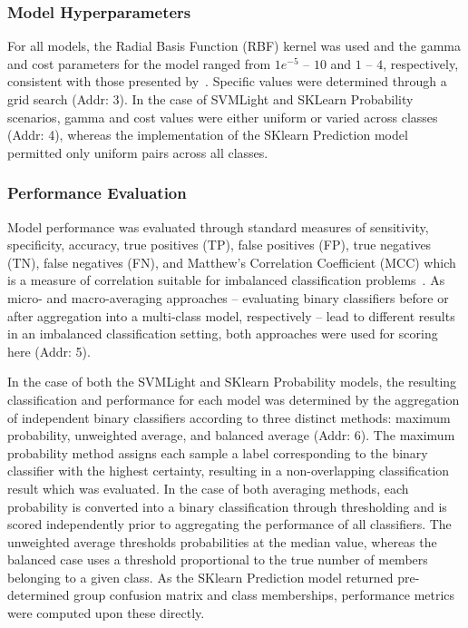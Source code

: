 \subsubsection{Model Hyperparameters}
For all models, the Radial Basis Function (RBF) kernel was used and the gamma and cost parameters for the model ranged
from $1e^{-5}$ -- $10$ and $1$ -- $4$, respectively, consistent with those presented by~\cite{mishra2014prediction}.
Specific values were determined through a grid search (Addr: 3). In the case of SVMLight and SKLearn Probability
scenarios, gamma and cost values were either uniform or varied across classes (Addr: 4), whereas the implementation of
the SKlearn Prediction model permitted only uniform pairs across all classes.

\subsubsection{Performance Evaluation}
Model performance was evaluated through standard measures of sensitivity, specificity, accuracy, true positives (TP),
false positives (FP), true negatives (TN), false negatives (FN), and Matthew's Correlation Coefficient (MCC) which is a
measure of correlation suitable for imbalanced classification problems~\cite{mcc2017optimal}. As micro- and
macro-averaging approaches -- evaluating binary classifiers before or after aggregation into a multi-class model,
respectively -- lead to different results in an imbalanced classification setting, both approaches were used for
scoring here (Addr: 5).

In the case of both the SVMLight and SKlearn Probability models, the resulting classification and performance for each
model was determined by the aggregation of independent binary classifiers according to three distinct methods: maximum
probability, unweighted average, and balanced average (Addr: 6). The maximum probability method assigns each sample a
label corresponding to the binary classifier with the highest certainty, resulting in a non-overlapping classification
result which was evaluated. In the case of both averaging methods, each probability is converted into a binary
classification through thresholding and is scored independently prior to aggregating the performance of all classifiers.
The unweighted average thresholds probabilities at the median value, whereas the balanced case uses a threshold
proportional to the true number of members belonging to a given class. As the SKlearn Prediction model returned
pre-determined group confusion matrix and class memberships, performance metrics were computed upon these directly.

